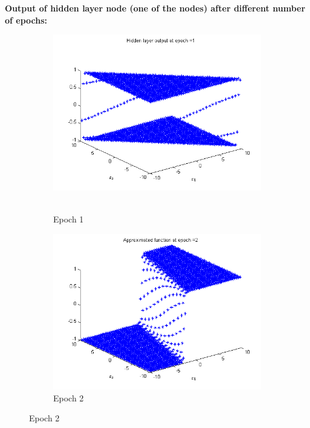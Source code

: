 \newpage

\textbf{Output of hidden layer node (one of the nodes) after different number of epochs:}

\begin{figure}
\begin{subfigure}{.5\textwidth}
  \centering
  \includegraphics[width=.8\linewidth]{Regression/bivariate/hidden_1layer_1.png}\
  \caption{Epoch 1}
\end{subfigure}%
\begin{subfigure}{.5\textwidth}
  \centering
  \includegraphics[width=.8\linewidth]{Regression/bivariate/hidden_1layer_2.png}
   \caption{Epoch 2}
  \end{subfigure}
  

\end{figure}
